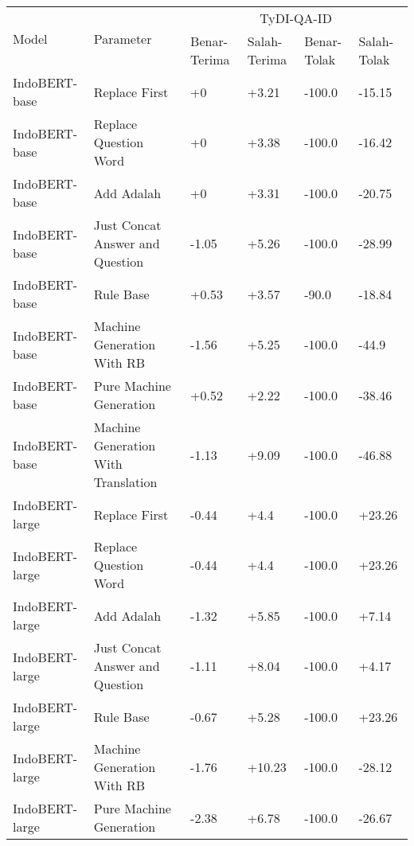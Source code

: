 \begin{table}[H]\centering
\scriptsize
\begin{tabular}{llllll}
\toprule
         \multirow{2}{*}{Model} &\multirow{2}{*}{Parameter} &\multicolumn{4}{c}{TyDI-QA-ID} \\\cmidrule{3-6}
& &Benar-Terima &Salah-Terima &Benar-Tolak &Salah-Tolak \\\midrule
 IndoBERT-base &                       Replace First &           +0 &        +3.21 &      -100.0 &      -15.15 \\
 IndoBERT-base &               Replace Question Word &           +0 &        +3.38 &      -100.0 &      -16.42 \\
 IndoBERT-base &                          Add Adalah &           +0 &        +3.31 &      -100.0 &      -20.75 \\
 IndoBERT-base &     Just Concat Answer and Question &        -1.05 &        +5.26 &      -100.0 &      -28.99 \\
 IndoBERT-base &                           Rule Base &        +0.53 &        +3.57 &       -90.0 &      -18.84 \\
 IndoBERT-base &          Machine Generation With RB &        -1.56 &        +5.25 &      -100.0 &       -44.9 \\
 IndoBERT-base &             Pure Machine Generation &        +0.52 &        +2.22 &      -100.0 &      -38.46 \\
 IndoBERT-base & Machine Generation With Translation &        -1.13 &        +9.09 &      -100.0 &      -46.88 \\
\hline
IndoBERT-large &                       Replace First &        -0.44 &         +4.4 &      -100.0 &      +23.26 \\
IndoBERT-large &               Replace Question Word &        -0.44 &         +4.4 &      -100.0 &      +23.26 \\
IndoBERT-large &                          Add Adalah &        -1.32 &        +5.85 &      -100.0 &       +7.14 \\
IndoBERT-large &     Just Concat Answer and Question &        -1.11 &        +8.04 &      -100.0 &       +4.17 \\
IndoBERT-large &                           Rule Base &        -0.67 &        +5.28 &      -100.0 &      +23.26 \\
IndoBERT-large &          Machine Generation With RB &        -1.76 &       +10.23 &      -100.0 &      -28.12 \\
IndoBERT-large &             Pure Machine Generation &        -2.38 &        +6.78 &      -100.0 &      -26.67 \\

\end{tabular}
\end{table}
